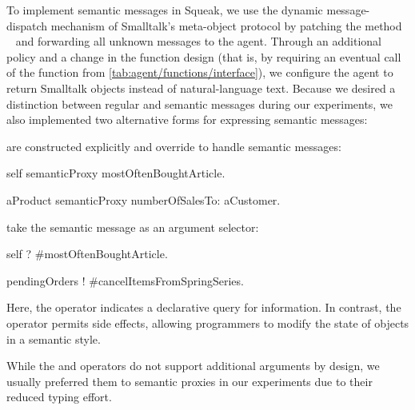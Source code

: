 To implement semantic messages in Squeak, we use the dynamic message-dispatch mechanism of Smalltalk's meta-object protocol by patching the method ~\cite[sec.~5.11]{ingalls2020evolution} and forwarding all unknown messages to the agent.
Through an additional policy and a change in the function design (that is, by requiring an eventual call of the  function from \cref{tab:agent/functions/interface}), we configure the agent to return Smalltalk objects instead of natural-language text.
Because we desired a distinction between regular and semantic messages during our experiments, we also implemented two alternative forms for expressing semantic messages:
\begin{description}[noextralabelsep]
	\item[Semantic proxies] are constructed explicitly and override  to handle semantic messages:
	\begin{multicode}
		self semanticProxy mostOftenBoughtArticle.

		aProduct semanticProxy numberOfSalesTo: aCustomer.
	\end{multicode}
	\item[The \code{\;?\;} and \code{!} operators] take the semantic message as an argument selector: %
	\begin{multicode}
		self ? \#mostOftenBoughtArticle.

		pendingOrders ! \#cancelItemsFromSpringSeries.
	\end{multicode}
	Here, the  operator indicates a declarative query for information.
	In contrast, the \code{!} operator permits side effects, allowing programmers to modify the state of objects in a semantic style.
\end{description}
While the  and \code{!} operators do not support additional arguments by design, we usually preferred them to semantic proxies in our experiments due to their reduced typing effort.
